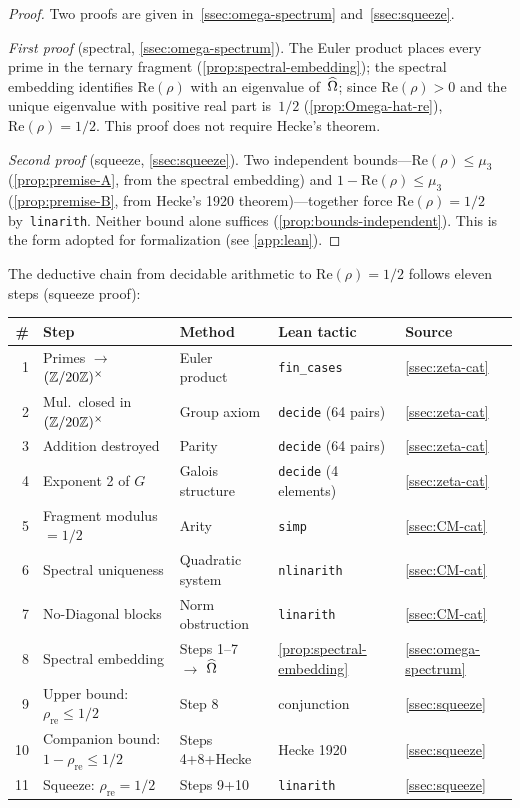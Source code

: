 \begin{proof}
Two proofs are given in~\cref{ssec:omega-spectrum}
and~\cref{ssec:squeeze}.

\emph{First proof} (spectral, \cref{ssec:omega-spectrum}).
The Euler product places every prime in the ternary fragment
(\cref{prop:spectral-embedding}); the spectral embedding
identifies $\mathrm{Re}(\rho)$ with an eigenvalue
of~$\widehat{\Omega}$; since $\mathrm{Re}(\rho)>0$ and the unique eigenvalue
with positive real part is~$1/2$
(\cref{prop:Omega-hat-re}),
$\mathrm{Re}(\rho)=1/2$.  This proof does not require Hecke's
theorem.

\emph{Second proof} (squeeze, \cref{ssec:squeeze}).
Two independent bounds---$\mathrm{Re}(\rho)\le\mu_3$
(\cref{prop:premise-A}, from the spectral embedding)
and $1-\mathrm{Re}(\rho)\le\mu_3$
(\cref{prop:premise-B}, from Hecke's 1920 theorem)---together force
$\mathrm{Re}(\rho)=1/2$ by~\texttt{linarith}.  Neither bound alone
suffices (\cref{prop:bounds-independent}).
This is the form adopted for formalization (see \cref{app:lean}).
\end{proof}

The deductive chain from decidable arithmetic to
$\mathrm{Re}(\rho)=1/2$ follows eleven steps (squeeze proof):
\begin{center}
\small
\begin{tabular}{rllll}
\toprule
\# & Step & Method & Lean tactic & Source \\
\midrule
1 & Primes $\to$ $(\mathbb{Z}/20\mathbb{Z})^\times$ & Euler product & \texttt{fin\_cases} & \cref{ssec:zeta-cat} \\
2 & Mul.\ closed in $(\mathbb{Z}/20\mathbb{Z})^\times$ & Group axiom & \texttt{decide} (64 pairs) & \cref{ssec:zeta-cat} \\
3 & Addition destroyed & Parity & \texttt{decide} (64 pairs) & \cref{ssec:zeta-cat} \\
4 & Exponent 2 of $G$ & Galois structure & \texttt{decide} (4 elements) & \cref{ssec:zeta-cat} \\
5 & Fragment modulus $=1/2$ & Arity & \texttt{simp} & \cref{ssec:CM-cat} \\
6 & Spectral uniqueness & Quadratic system & \texttt{nlinarith} & \cref{ssec:CM-cat} \\
7 & No-Diagonal blocks & Norm obstruction & \texttt{linarith} & \cref{ssec:CM-cat} \\
8 & Spectral embedding & Steps 1--7 $\to$ $\widehat{\Omega}$ & \cref{prop:spectral-embedding} & \cref{ssec:omega-spectrum} \\
9 & Upper bound: $\rho_{\mathrm{re}}\le 1/2$ & Step 8 & conjunction & \cref{ssec:squeeze} \\
10 & Companion bound: $1-\rho_{\mathrm{re}}\le 1/2$ & Steps 4+8+Hecke & Hecke 1920 & \cref{ssec:squeeze} \\
11 & Squeeze: $\rho_{\mathrm{re}}=1/2$ & Steps 9+10 & \texttt{linarith} & \cref{ssec:squeeze} \\
\bottomrule
\end{tabular}
\end{center}

